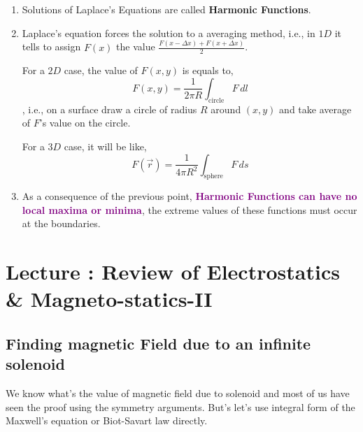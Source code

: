 \documentclass{article}
\newcommand{\lecture}[1]{
  \section{Lecture \thesection: #1}
}
\begin{document}
\begin{note}
    \begin{enumerate}
        \item Solutions of Laplace's Equations are called \textbf{Harmonic Functions}.
        \item Laplace's equation forces the solution to a averaging method, i.e., in $1D$ it tells to assign $F(x)$ the value $\frac{F(x-\Delta x ) + F(x + \Delta x)}{2}$.
    
        For a $2D$ case, the value of $F(x,y)$ is equals to,
        $$ F(x,y) = \frac{1}{2\pi R}\int_{\text{circle}} F\, dl$$, i.e., on a surface draw a circle of radius $R$ around $(x,y)$ and take average of $F$'s value on the circle.
    
        For a $3D$ case, it will be like,
        $$F(\vec{r})=\frac{1}{4\pi R^2}\int_{\text{sphere}}F\, ds$$
    
        \item As a consequence of the previous point, \textcolor{purple}{\textbf{Harmonic Functions can have no local maxima or minima}}, the extreme values of these functions must occur at the boundaries.
    \end{enumerate}
\end{note}
\lecture{Review of Electrostatics \& Magneto-statics-II}
\subsection{Finding magnetic Field due to an infinite solenoid}
We know what's the value of magnetic field due to solenoid and most of us have seen the proof using the symmetry arguments. But's let's use integral form of the Maxwell's equation or Biot-Savart law directly.
\end{document}
